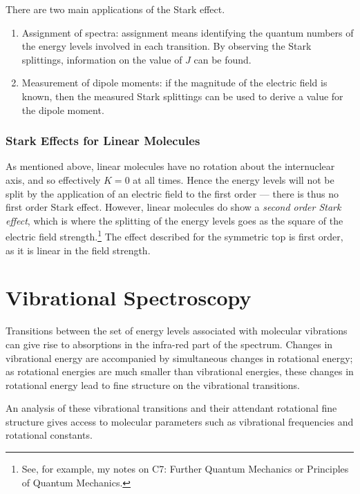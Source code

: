\documentclass{article}
\theoremstyle{plain}\theoremheaderfont{\normalfont\itshape}\theorembodyfont{\rmfamily}\theoremseparator{.}\newtheorem*{rem}{Remark}\newtheorem*{ex}{Example}\newtheorem*{proof}{Proof}\newtheorem*{altp}{Alternative proof}
\theoremstyle{plain}\theoremheaderfont{\normalfont\bfseries}\theorembodyfont{\rmfamily}\theoremseparator{.}\newtheorem{thm}{Theorem}[section]\newtheorem{lem}[thm]{Lemma}\newtheorem{prop}[thm]{Proposition}\newtheorem*{cor}{Corollary}\newtheorem{defn}[thm]{Definition}\newtheorem{clm}[thm]{Claim}\newtheorem{clminproof}{Claim}\newtheorem{pos}{Postulate}[section]
\theoremstyle{break}\theoremheaderfont{\normalfont\itshape}\theorembodyfont{\rmfamily}\theoremseparator{.\medskip}\newtheorem*{proofskip}{Proof}\newtheorem*{exs}{Examples}\newtheorem*{rems}{Remarks}
\theoremstyle{break}\theoremheaderfont{\normalfont\bfseries}\theorembodyfont{\rmfamily}\theoremseparator{.\medskip}\newtheorem{lemskip}[thm]{Lemma}\newtheorem{defnskip}[thm]{Definition}\newtheorem{propskip}[thm]{Proposition}\newtheorem{thmskip}[thm]{Theorem}
\numberwithin{equation}{section}
\begin{document}
    There are two main applications of the Stark effect.
    \begin{enumerate}[topsep=0pt,label=(\roman*)]
        \item Assignment of spectra: assignment means identifying the quantum numbers of the energy levels involved in each transition. By observing the Stark splittings, information on the value of \(J\) can be found.
        \item Measurement of dipole moments: if the magnitude of the electric field is known, then the measured Stark splittings can be used to derive a value for the dipole moment.
    \end{enumerate}
    \subsubsection{Stark Effects for Linear Molecules}
    As mentioned above, linear molecules have no rotation about the internuclear axis, and so effectively \(K=0\) at all times. Hence the energy levels will not be split by the application of an electric field to the first order --- there is thus no first order Stark effect. However, linear molecules do show a \textit{second order Stark effect}, which is where the splitting of the energy levels goes as the square of the electric field strength.\footnote{See, for example, my notes on C7: Further Quantum Mechanics or Principles of Quantum Mechanics.} The effect described for the symmetric top is first order, as it is linear in the field strength.

    \newpage
    \section{Vibrational Spectroscopy}
    Transitions between the set of energy levels associated with molecular vibrations can give rise to absorptions in the infra-red part of the spectrum. Changes in vibrational energy are accompanied by simultaneous changes in rotational energy; as rotational energies are much smaller than vibrational energies, these changes in rotational energy lead to fine structure on the vibrational transitions.

    An analysis of these vibrational transitions and their attendant rotational fine structure gives access to molecular parameters such as vibrational frequencies and rotational constants.
\end{document}
